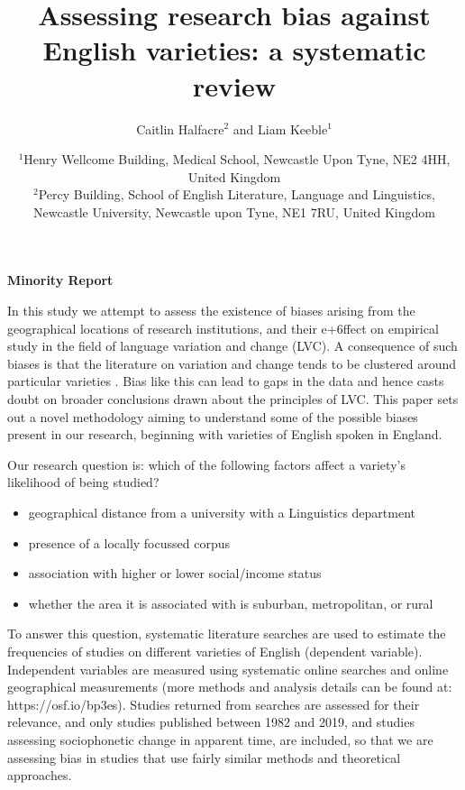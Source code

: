 \documentclass[12pt,a4paper]{article}
\title{Assessing research bias against English varieties: a systematic review}
\author{Caitlin Halfacre$^{2}$ and Liam Keeble$^{1}$}
\date{$^{1}$Henry Wellcome Building, Medical School, Newcastle Upon Tyne, NE2 4HH, United Kingdom\\
$^{2}$Percy Building, School of English Literature, Language and Linguistics, Newcastle University, Newcastle upon Tyne, NE1 7RU, United Kingdom\\}
\newcommand{\todocontentinline}[1]{\todo[color=RoyalPurple,inline]{#1}}
\begin{document}
\begin{center}
	\textbf{Minority Report}\\
\end{center}

\todocontentinline{Current word count 261}

In this study we attempt to assess the existence of biases arising from the geographical locations of research institutions, and their e+6ffect on empirical study in the field of language variation and change (LVC).  
A consequence of such biases is that the literature on variation and change tends to be clustered around particular varieties \cite{Trudgill2002}. Bias like this can lead to gaps in the data and hence casts doubt on broader conclusions drawn about the principles of LVC. This paper sets out a novel methodology aiming to understand some of the possible biases present in our research, beginning with varieties of English spoken in England. 
	
Our research question is: which of the following factors affect a variety's likelihood of being studied?
	\begin{itemize}
		\item geographical distance from a university with a Linguistics department
		\item presence of a locally focussed corpus
		\item association with higher or lower social/income status
		\item whether the area it is associated with is suburban, metropolitan, or rural
	\end{itemize}


To answer this question, systematic literature searches \citep{lefebvre2019searching} are used to estimate the frequencies of studies on different varieties of English (dependent variable). Independent variables are measured using systematic online searches and online geographical measurements (more methods and analysis details can be found at: https://osf.io/bp3es). Studies returned from searches are assessed for their relevance, and only studies published between 1982 \citep{Wells1982b} and 2019, and studies assessing sociophonetic change in apparent time, are included, so that we are assessing bias in studies that use fairly similar methods and theoretical approaches.

\pagebreak

\end{document}
